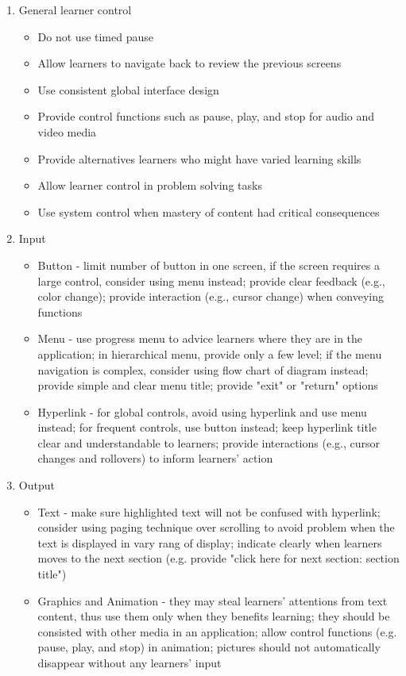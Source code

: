 \begin{enumerate} 
\item General learner control 
\begin{itemize} 
\item Do not use timed pause
\item Allow learners to navigate back to review the previous screens
\item Use consistent global interface design
\item Provide control functions such as pause, play, and stop for audio and video media
\item Provide alternatives learners who might have varied learning skills
\item Allow learner control in problem solving tasks
\item Use system control when mastery of content had critical consequences
\end{itemize} 
\item Input 
\begin{itemize}
\item Button - limit number of button in one screen, if the screen requires a large control, consider using menu instead; provide clear feedback (e.g., color change); provide interaction (e.g., cursor change) when conveying functions
\item Menu - use progress menu to advice learners where they are in the application; in hierarchical menu, provide only a few level; if the menu navigation is complex, consider using flow chart of diagram instead; provide simple and clear menu title; provide "exit" or "return" options
\item Hyperlink - for global controls, avoid using hyperlink and use menu instead; for frequent controls, use button instead; keep hyperlink title clear and understandable to learners; provide interactions (e.g., cursor changes and rollovers) to inform learners' action
\end{itemize} 
\item Output 
\begin{itemize} 
\item Text - make sure highlighted text will not be confused with hyperlink; consider using paging technique over scrolling to avoid problem when the text is displayed in vary rang of display; indicate clearly when learners moves to the next section (e.g. provide "click here for next section: section title")
\item Graphics and Animation - they may steal learners' attentions from text content, thus use them only when they benefits learning; they should be consisted with other media in an application; allow control functions (e.g. pause, play, and stop) in animation; pictures should not automatically disappear without any learners' input 

\end{itemize}
\end{enumerate}
